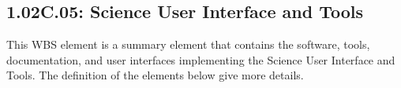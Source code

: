 \subsection{1.02C.05: Science User Interface and Tools}

This WBS element is a summary element that contains the software, tools,
documentation, and user interfaces implementing the Science User Interface and
Tools. The definition of the elements below give more details.
